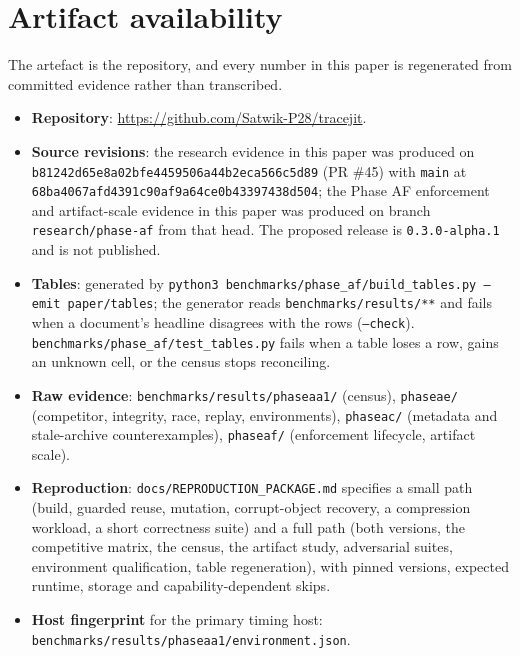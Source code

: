 \section{Artifact availability}

The artefact is the repository, and every number in this paper is regenerated from committed
evidence rather than transcribed.

\begin{itemize}
  \item \textbf{Repository}: \url{https://github.com/Satwik-P28/tracejit}.
  \item \textbf{Source revisions}: the research evidence in this paper was produced on
  \texttt{b81242d65e8a02bfe4459506a44b2eca566c5d89} (PR \#45) with \texttt{main} at
  \texttt{68ba4067afd4391c90af9a64ce0b43397438d504}; the Phase AF enforcement and artifact-scale
  evidence in this paper was produced on branch \texttt{research/phase-af} from that head. The
  proposed release is \texttt{0.3.0-alpha.1} and is not published.
  \item \textbf{Tables}: generated by
  \texttt{python3 benchmarks/phase\_af/build\_tables.py --emit paper/tables}; the generator reads
  \texttt{benchmarks/results/**} and fails when a document's headline disagrees with the rows
  (\texttt{--check}). \texttt{benchmarks/phase\_af/test\_tables.py} fails when a table loses a row,
  gains an unknown cell, or the census stops reconciling.
  \item \textbf{Raw evidence}: \texttt{benchmarks/results/phaseaa1/} (census),
  \texttt{phaseae/} (competitor, integrity, race, replay, environments),
  \texttt{phaseac/} (metadata and stale-archive counterexamples),
  \texttt{phaseaf/} (enforcement lifecycle, artifact scale).
  \item \textbf{Reproduction}: \texttt{docs/REPRODUCTION\_PACKAGE.md} specifies a small path (build,
  guarded reuse, mutation, corrupt-object recovery, a compression workload, a short correctness
  suite) and a full path (both \firebuild{} versions, the competitive matrix, the census, the
  artifact study, adversarial suites, environment qualification, table regeneration), with pinned
  versions, expected runtime, storage and capability-dependent skips.
  \item \textbf{Host fingerprint} for the primary timing host:
  \texttt{benchmarks/results/phaseaa1/environment.json}.
\end{itemize}


